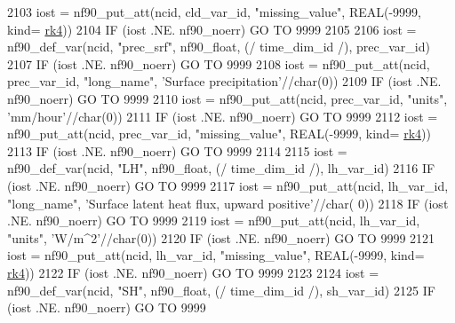 \begin{DoxyCode}
{2103     iost    = nf90\_put\_att(ncid, cld\_var\_id, \textcolor{stringliteral}{"missing\_value"}, \textcolor{keywordtype}{REAL}(-9999, kind=
      \hyperlink{namespaceportable_abaed22a509442771d3fba69bebda0b33}{rk4}))
2104     \textcolor{keywordflow}{IF} (iost .NE. nf90\_noerr) \textcolor{keywordflow}{GO TO} 9999
2105 
2106     iost    = nf90\_def\_var(ncid, \textcolor{stringliteral}{"prec\_srf"}, nf90\_float, (/ time\_dim\_id /), prec\_var\_id)
2107     \textcolor{keywordflow}{IF} (iost .NE. nf90\_noerr) \textcolor{keywordflow}{GO TO} 9999
2108     iost    = nf90\_put\_att(ncid, prec\_var\_id, \textcolor{stringliteral}{"long\_name"}, \textcolor{stringliteral}{'Surface precipitation'}//char(0))
2109     \textcolor{keywordflow}{IF} (iost .NE. nf90\_noerr) \textcolor{keywordflow}{GO TO} 9999
2110     iost    = nf90\_put\_att(ncid, prec\_var\_id, \textcolor{stringliteral}{"units"}, \textcolor{stringliteral}{'mm/hour'}//char(0))
2111     \textcolor{keywordflow}{IF} (iost .NE. nf90\_noerr) \textcolor{keywordflow}{GO TO} 9999
2112     iost    = nf90\_put\_att(ncid, prec\_var\_id, \textcolor{stringliteral}{"missing\_value"}, \textcolor{keywordtype}{REAL}(-9999, kind=
      \hyperlink{namespaceportable_abaed22a509442771d3fba69bebda0b33}{rk4}))
2113     \textcolor{keywordflow}{IF} (iost .NE. nf90\_noerr) \textcolor{keywordflow}{GO TO} 9999
2114 
2115     iost    = nf90\_def\_var(ncid, \textcolor{stringliteral}{"LH"}, nf90\_float, (/ time\_dim\_id /), lh\_var\_id)
2116     \textcolor{keywordflow}{IF} (iost .NE. nf90\_noerr) \textcolor{keywordflow}{GO TO} 9999
2117     iost    = nf90\_put\_att(ncid, lh\_var\_id, \textcolor{stringliteral}{"long\_name"}, \textcolor{stringliteral}{'Surface latent heat flux, upward positive'}//char(
      0))
2118     \textcolor{keywordflow}{IF} (iost .NE. nf90\_noerr) \textcolor{keywordflow}{GO TO} 9999
2119     iost    = nf90\_put\_att(ncid, lh\_var\_id, \textcolor{stringliteral}{"units"}, \textcolor{stringliteral}{'W/m^2'}//char(0))
2120     \textcolor{keywordflow}{IF} (iost .NE. nf90\_noerr) \textcolor{keywordflow}{GO TO} 9999
2121     iost    = nf90\_put\_att(ncid, lh\_var\_id, \textcolor{stringliteral}{"missing\_value"}, \textcolor{keywordtype}{REAL}(-9999, kind=
      \hyperlink{namespaceportable_abaed22a509442771d3fba69bebda0b33}{rk4}))
2122     \textcolor{keywordflow}{IF} (iost .NE. nf90\_noerr) \textcolor{keywordflow}{GO TO} 9999
2123 
2124     iost    = nf90\_def\_var(ncid, \textcolor{stringliteral}{"SH"}, nf90\_float, (/ time\_dim\_id /), sh\_var\_id)
2125     \textcolor{keywordflow}{IF} (iost .NE. nf90\_noerr) \textcolor{keywordflow}{GO TO} 9999
}
\end{DoxyCode}
